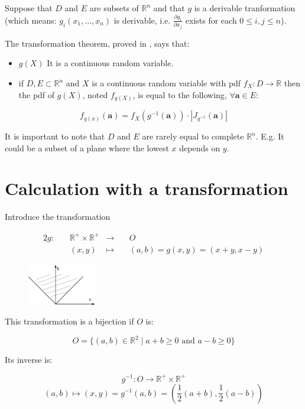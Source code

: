 \documentclass{article}
\newcommand\R{{\mathbb R} }
\begin{document}
Suppose that $D$ and $E$ are subsets of $\R^n$ and that $g$ is a derivable tranformation (which means: $g_i(x_1,...,x_n)$ is derivable, i.e. $\frac{\partial g_i}{\partial x_j}$ exists for each $0 \le i,j  \le n$).  

The transformation theorem, proved in \cite[2.7]{Hogg-McKean}, says that:

\begin{itemize}
\item $g(X)$ It is a continuous random variable.
\item if $D, E \subset \R ^n$ and $X$ is a continuous random variable with pdf $f_X:D \rightarrow \R $ then the pdf of
  $g(X)$, noted $f_{g(X)}$, is equal to the following, $\forall {\mathbf a} \in E$:
\end{itemize}

$$  f_{g(x)}({\mathbf a}) = f_X(g^{-1}({\mathbf a})) \cdot | J_{g^{-1}}({\mathbf a})|$$

It is important to note that $D$ and $E$ are rarely equal to complete $\R^n$. E.g. It could be a subset of a plane where the lowest $x$ depends on $y$.

\section{Calculation with a transformation}

Introduce the transformation 

\begin{alignat*}{2}
g:\quad & \R^+ \times \R^+ &\longrightarrow \quad & O \\
& (x,y) & \mapsto\quad & (a,b) = g(x,y) = (x+y, x-y) 
\end{alignat*}

\begin{figure}\includegraphics[width=30mm]{transformation-domain}\vspace{10mm}\end{figure}
This transformation is  a bijection if $O$ is:

$$O = \{ (a,b)\in\R^2 \mid a+b \geq 0 \mbox{ and } a-b\geq 0\}$$

Its inverse is:

$$ g^{-1}: O \longrightarrow \R^+ \times \R^+$$
$$ (a,b) \mapsto (x,y) = g^{-1}(a,b) = \left( \frac{1}{2} (a+b), \frac{1}{2}(a-b) \right)$$
\end{document}
